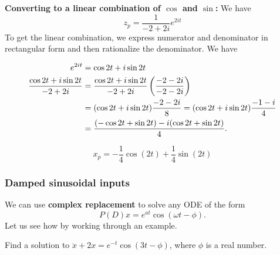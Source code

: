 \textbf{\color{blue} Converting to a linear combination of $\cos$ and $\sin$:}
We have
\begin{equation*}
  \displaystyle z_ p
  \displaystyle = \frac{1}{-2 + 2i} e^{2it} 
\end{equation*}
To get the linear combination, we express numerator and denominator in rectangular form and then rationalize the denominator. We have

\begin{align*}
  \displaystyle e^{2it} \displaystyle &= \displaystyle  \cos 2t + i \sin 2t \\
  \displaystyle \frac{\cos 2t + i \sin 2t}{-2+2i}
  \displaystyle &= \displaystyle  \frac{\cos 2t + i \sin 2t}{-2+2i} \left(\frac{-2-2i}{-2-2i}\right) \\
  \displaystyle &= \displaystyle (\cos 2t + i \sin 2t) \frac{-2-2i}{8}
                  =(\cos 2t + i \sin 2t) \frac{-1-i}{4} \\
  \displaystyle &= \displaystyle  \frac{(-\cos 2t +\sin 2t) - i(\cos 2t +\sin 2t)}{4}.                  
\end{align*}

\Conclusion
\begin{equation*}
  \boxed {x_ p = -\frac{1}{4} \cos (2t) + \frac{1}{4} \sin (2t)}
\end{equation*}
\clearpage

\subsubsection{Damped sinusoidal inputs}
We can use \textbf{complex replacement} to solve any ODE of the form
\begin{equation*}
  P(D)x = e^{at}\cos (\omega t -\phi ).
\end{equation*}
Let us see how by working through an example.

\begin{example}
  Find a solution to $\ddot{x} + 2x = e^{-t} \cos (3t - \phi)$, where $\phi$ is a real number. 
\end{example}

